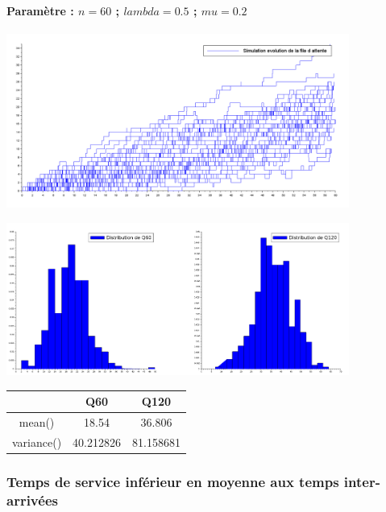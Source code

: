 \documentclass{article}
\begin{document}
\paragraph{Paramètre : $n=60$ ; $lambda=0.5$ ; $mu=0.2$}
\begin{center}
	\includegraphics[width=425px]{img/inf.PNG}
\end{center}
\begin{center}
	\includegraphics[width=425px]{img/sup/dist.png}
\end{center}
\begin{center}
	\begin{tabular}{c||c||c}
		& Q60 & Q120 \\
		\hline \hline
		mean() & 18.54 & 36.806 \\
		\hline \hline
		variance() & 40.212826 & 81.158681 \\
	\end{tabular}
\end{center}

\subsubsection{Temps de service inférieur en moyenne aux temps inter-arrivées}
\end{document}
